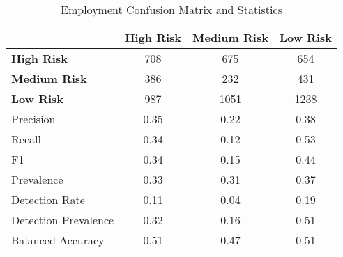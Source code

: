 \begin{table}[!htbp]
    \small
    \centering
    \caption{Employment Confusion Matrix and Statistics}
    \label{tab:emp_confusion}
    \begin{tabular}{lccc}
        \toprule
        & \textbf{High Risk} & \textbf{Medium Risk} & \textbf{Low Risk} \\
        \midrule
        \textbf{High Risk} & 708 & 675 & 654 \\
        \textbf{Medium Risk} & 386 & 232 & 431 \\
        \textbf{Low Risk} & 987 & 1051 & 1238 \\
        \bottomrule
        \midrule
        Precision & 0.35 & 0.22 & 0.38 \\
        Recall & 0.34 & 0.12 & 0.53 \\
        F1 & 0.34 & 0.15 & 0.44 \\
        Prevalence & 0.33 & 0.31 & 0.37 \\
        Detection Rate & 0.11 & 0.04 & 0.19 \\
        Detection Prevalence & 0.32 & 0.16 & 0.51 \\
        Balanced Accuracy & 0.51 & 0.47 & 0.51 \\
        \bottomrule
    \end{tabular}
\end{table}